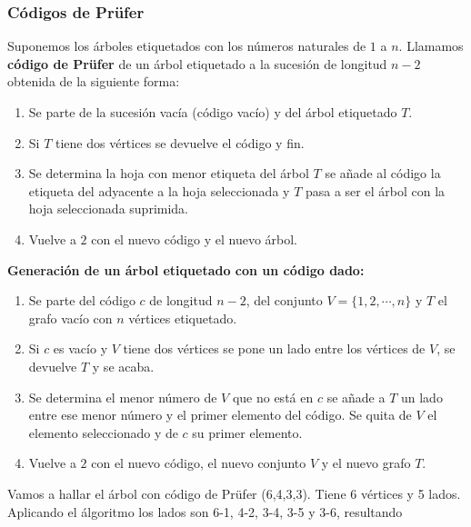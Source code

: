 \subsubsection{Códigos de Prüfer}
Suponemos los árboles etiquetados con los números naturales de $1$ a $n$. Llamamos \textbf{código de Prüfer} de un árbol etiquetado a la sucesión de longitud $n-2$ obtenida de la siguiente forma:
\begin{enumerate}
    \item Se parte de la sucesión vacía (código vacío) y del árbol etiquetado $T$.
    \item Si $T$ tiene dos vértices se devuelve el código y fin.
    \item Se determina la hoja con menor etiqueta del árbol $T$ se añade al código la etiqueta del adyacente a la hoja seleccionada y $T$ pasa a ser el árbol con la hoja seleccionada suprimida.
    \item Vuelve a $2$ con el nuevo código y el nuevo árbol.
\end{enumerate}
\textbf{Generación de un árbol etiquetado con un código dado:}
\begin{enumerate}
    \item Se parte del código $c$ de longitud $n-2$, del conjunto $V=\{1,2,\cdots,n\}$ y $T$ el grafo vacío con $n$ vértices etiquetado.
    \item Si $c$ es vacío y $V$ tiene dos vértices se pone un lado entre los vértices de $V$, se devuelve $T$ y se acaba.
    \item Se determina el menor número de $V$ que no está en $c$ se añade a $T$ un lado entre ese menor número y el primer elemento del código. Se quita de $V$ el elemento seleccionado y de $c$ su primer elemento.
    \item Vuelve a $2$ con el nuevo código, el nuevo conjunto $V$ y el nuevo grafo $T$.
\end{enumerate}
\begin{ejemplo}
    Vamos a hallar el árbol con código de Prüfer (6,4,3,3). Tiene 6 vértices y 5 lados. Aplicando el álgoritmo los lados son 6-1, 4-2, 3-4, 3-5 y 3-6, resultando
    \begin{center}
    \end{center}
\end{ejemplo}


